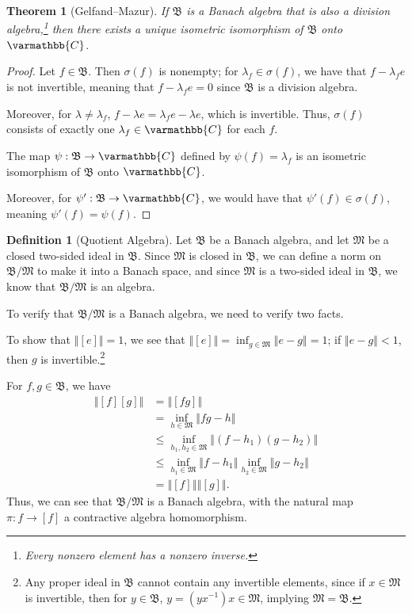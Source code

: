 \documentclass[10pt]{extarticle}
\newcommand{\C}{\mathbb{C}}
\newcommand{\norm}[1]{\left\Vert #1\right\Vert}
\theoremstyle{plain}
\newtheorem*{theorem}{Theorem}
\theoremstyle{definition}
\newtheorem*{definition}{Definition}
\theoremstyle{note}
\renewcommand*{\mathbb}[1]{\varmathbb{#1}}
\renewcommand{\newline}{\hfill\break}
\begin{document}
\begin{theorem}[Gelfand--Mazur]
  If $\mathfrak{B}$ is a Banach algebra that is also a division algebra,\footnote{Every nonzero element has a nonzero inverse.} then there exists a unique isometric isomorphism of $\mathfrak{B}$ onto $\C$.
\end{theorem}
\begin{proof}
  Let $f\in \mathfrak{B}$. Then $\sigma(f)$ is nonempty; for $\lambda_f\in \sigma(f)$, we have that $f-\lambda_f e$ is not invertible, meaning that $f - \lambda_f e = 0$ since $\mathfrak{B}$ is a division algebra.\newline

  Moreover, for $\lambda \neq \lambda_f$, $f - \lambda e = \lambda_f e - \lambda e$, which is invertible. Thus, $\sigma(f)$ consists of exactly one $\lambda_f\in \C$ for each $f$.\newline

  The map $\psi: \mathfrak{B}\rightarrow \C$ defined by $\psi(f) = \lambda_f$ is an isometric isomorphism of $\mathfrak{B}$ onto $\C$.\newline

  Moreover, for $\psi': \mathfrak{B} \rightarrow \C$, we would have that $\psi'(f) \in \sigma(f)$, meaning $\psi'(f) = \psi(f)$.
\end{proof}
\begin{definition}[Quotient Algebra]
Let $\mathfrak{B}$ be a Banach algebra, and let $\mathfrak{M}$ be a closed two-sided ideal in $\mathfrak{B}$. Since $\mathfrak{M}$ is closed in $\mathfrak{B}$, we can define a norm on $\mathfrak{B}/\mathfrak{M}$ to make it into a Banach space, and since $\mathfrak{M}$ is a two-sided ideal in $\mathfrak{B}$, we know that $\mathfrak{B}/\mathfrak{M}$ is an algebra.\newline

To verify that $\mathfrak{B}/\mathfrak{M}$ is a Banach algebra, we need to verify two facts.\newline

To show that $\norm{[e]} = 1$, we see that $\norm{[e]} = \inf_{g\in \mathfrak{M}} \norm{e-g} = 1$; if $\norm{e-g} < 1$, then $g$ is invertible.\footnote{Any proper ideal in $\mathfrak{B}$ cannot contain any invertible elements, since if $x\in \mathfrak{M}$ is invertible, then for $y\in \mathfrak{B}$, $y = \left(yx^{-1}\right)x \in \mathfrak{M}$, implying $\mathfrak{M} = \mathfrak{B}$.}\newline

For $f,g\in \mathfrak{B}$, we have
\begin{align*}
  \norm{[f][g]} &= \norm{[fg]}\\
                &= \inf_{h\in \mathfrak{M}}\norm{fg - h}\\
                &\leq \inf_{h_1,h_2\in \mathfrak{M}}\norm{(f-h_1)(g-h_2)}\\
                &\leq \inf_{h_1\in \mathfrak{M}}\norm{f-h_1}\inf_{h_2\in \mathfrak{M}}\norm{g-h_2}\\
                &= \norm{[f]}\norm{[g]}.
\end{align*}
Thus, we can see that $\mathfrak{B}/\mathfrak{M}$ is a Banach algebra, with the natural map $\pi: f \rightarrow [f]$ a contractive algebra homomorphism.
\end{definition}
\end{document}
